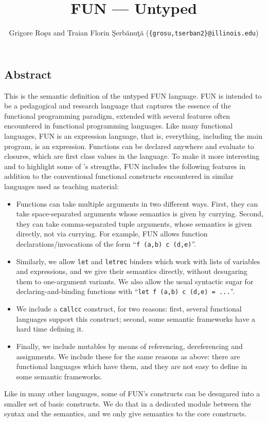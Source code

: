 \setlength{\parindent}{1em}
\title{FUN --- Untyped}
\author{Grigore Ro\c{s}u and 
        Traian Florin \c{S}erb\u{a}nu\c{t}\u{a} (\texttt{\{grosu,tserban2\}@illinois.edu})}

\maketitle

\begin{latexComment}
\section{Abstract}
This is the \K semantic definition of the untyped FUN language.
FUN is intended to be a pedagogical and research language that captures
the essence of the functional programming paradigm, extended with several
features often encountered in functional programming languages.
Like many functional languages, FUN is an expression language,
that is, everything, including the main program, is an expression.
Functions can be declared anywhere and evaluate to closures, which
are first class values in the language.  To make it more
interesting and to highlight some of \K's strengths, FUN includes
the following features in addition to the conventional functional
constructs encountered in similar languages used as teaching material:
\begin{itemize}
\item Functions can take multiple arguments in two different ways.
First, they can take space-separated arguments whose semantics is given by
currying.  Second, they can take comma-separated tuple arguments, whose
semantics is given directly, not via currying.  For example, FUN allows
function declarations/invocations of the form
``\texttt{f (a,b) c  (d,e)}''.
\item Similarly, we allow \texttt{let} and \texttt{letrec} binders
which work with lists of variables and expressions, and we give
their semantics directly, without desugaring them to one-argument variants.
We also allow the usual syntactic sugar for declaring-and-binding functions
with ``\texttt{let f (a,b) c (d,e) = ...}''.
\item We include a \texttt{callcc} construct, for two reasons: first,
several functional languages support this construct; second, some
semantic frameworks have a hard time defining it.
\item Finally, we include mutables by means of referencing, dereferencing and
assignments.  We include these for the same reasons as above: there are
functional languages which have them, and they are not easy to define
in some semantic frameworks.
\end{itemize}
Like in many other languages, some of FUN's constructs can be
desugared into a smaller set of basic constructs.  We do that in a 
dedicated module between the syntax and the semantics, and we only
give semantics to the core constructs.


\end{latexComment}
